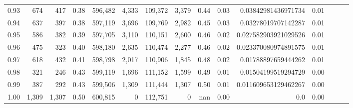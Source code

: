 \begin{tabular}{rrrrrrrrrrrrrrr}
0.93 &     674 &    417 &  0.38 &  596,482 &    4,333 &  109,372 &    3,379 &  0.44 &  0.03 &   0.03842981436971734 &      0.01 \\
0.94 &     637 &    397 &  0.38 &  597,119 &    3,696 &  109,769 &    2,982 &  0.45 &  0.03 &   0.03278019707142287 &      0.01 \\
0.95 &     586 &    382 &  0.39 &  597,705 &    3,110 &  110,151 &    2,600 &  0.46 &  0.02 &  0.027582903921029526 &      0.01 \\
0.96 &     475 &    323 &  0.40 &  598,180 &    2,635 &  110,474 &    2,277 &  0.46 &  0.02 &  0.023370080974891575 &      0.01 \\
0.97 &     618 &    432 &  0.41 &  598,798 &    2,017 &  110,906 &    1,845 &  0.48 &  0.02 &   0.01788897659444262 &      0.01 \\
0.98 &     321 &    246 &  0.43 &  599,119 &    1,696 &  111,152 &    1,599 &  0.49 &  0.01 &   0.01504199519294729 &      0.00 \\
0.99 &     387 &    292 &  0.43 &  599,506 &    1,309 &  111,444 &    1,307 &  0.50 &  0.01 &  0.011609653129462267 &      0.00 \\
1.00 &   1,309 &  1,307 &  0.50 &  600,815 &        0 &  112,751 &        0 &   nan &  0.00 &                   0.0 &      0.00 \\
\bottomrule
\end{tabular}
